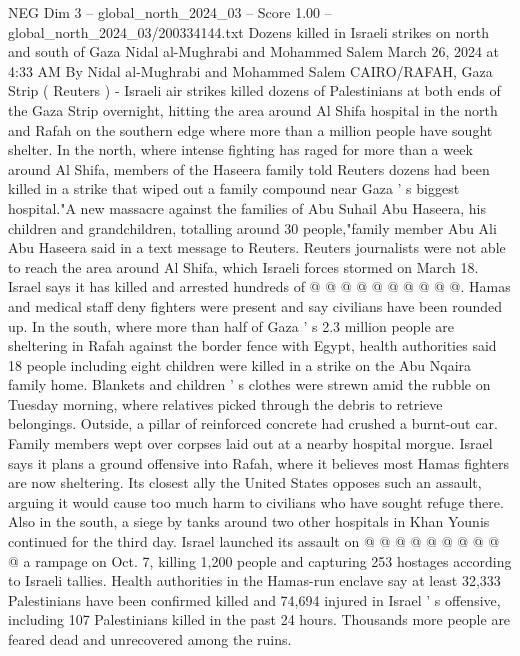 \begin{textsample}{NEG Dim 3 – global\_north\_2024\_03 – Score 1.00 – global\_north\_2024\_03/200334144.txt}  \label{ex:f3_neg_169}
Dozens killed in Israeli strikes on north and south of Gaza Nidal al-Mughrabi and Mohammed Salem March 26, 2024 at 4:33 AM By Nidal al-Mughrabi and Mohammed Salem CAIRO/RAFAH, Gaza Strip ( Reuters ) - Israeli air strikes killed dozens of Palestinians at both ends of the Gaza Strip overnight, hitting the area around Al Shifa hospital in the north and Rafah on the southern edge where more than a million people have sought shelter.
In the north, where intense fighting has raged for more than a week around Al Shifa, members of the Haseera family told Reuters dozens had been killed in a strike that wiped out a family compound near Gaza ' s biggest hospital."A new massacre against the families of Abu Suhail Abu Haseera, his children and grandchildren, totalling around 30 people,"family member Abu Ali Abu Haseera said in a text message to Reuters.
Reuters journalists were not able to reach the area around Al Shifa, which Israeli forces stormed on March 18.
Israel says it has killed and arrested hundreds of @ @ @ @ @ @ @ @ @ @.
Hamas and medical staff deny fighters were present and say civilians have been rounded up.
In the south, where more than half of Gaza ' s 2.3 million people are sheltering in Rafah against the border fence with Egypt, health authorities said 18 people including eight children were killed in a strike on the Abu Nqaira family home.
Blankets and children ' s clothes were strewn amid the rubble on Tuesday morning, where relatives picked through the debris to retrieve belongings.
Outside, a pillar of reinforced concrete had crushed a burnt-out car.
Family members wept over corpses laid out at a nearby hospital morgue.
Israel says it plans a ground offensive into Rafah, where it believes most Hamas fighters are now sheltering.
Its closest ally the United States opposes such an assault, arguing it would cause too much harm to civilians who have sought refuge there.
Also in the south, a siege by tanks around two other hospitals in Khan Younis continued for the third day.
Israel launched its assault on @ @ @ @ @ @ @ @ @ @ a rampage on Oct. 7, killing 1,200 people and capturing 253 hostages according to Israeli tallies.
Health authorities in the Hamas-run enclave say at least 32,333 Palestinians have been confirmed killed and 74,694 injured in Israel ' s offensive, including 107 Palestinians killed in the past 24 hours.
Thousands more people are feared dead and unrecovered among the ruins.

\end{textsample}
